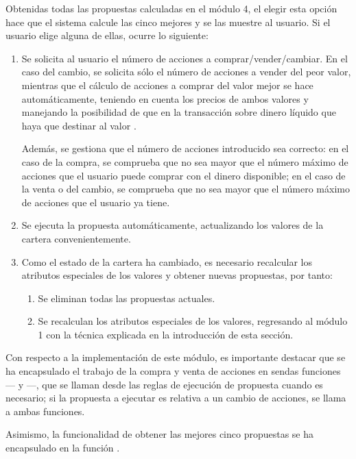 \documentclass[a4paper, 11pt, titlepage]{article}
\begin{document}
    Obtenidas todas las propuestas calculadas en el módulo 4, el elegir esta opción hace que el sistema calcule las cinco mejores y se las muestre al usuario. Si el usuario elige alguna de ellas, ocurre lo siguiente:
    \begin{enumerate}
        \item Se solicita al usuario el número de acciones a comprar/vender/cambiar. En el caso del cambio, se solicita sólo el número de acciones a vender del peor valor, mientras que el cálculo de acciones a comprar del valor mejor se hace automáticamente, teniendo en cuenta los precios de ambos valores y manejando la posibilidad de que en la transacción sobre dinero líquido que haya que destinar al valor .

        Además, se gestiona que el número de acciones introducido sea correcto: en el caso de la compra, se comprueba que no sea mayor que el número máximo de acciones que el usuario puede comprar con el dinero disponible; en el caso de la venta o del cambio, se comprueba que no sea mayor que el número máximo de acciones que el usuario ya tiene.
        \item Se ejecuta la propuesta automáticamente, actualizando los valores de la cartera convenientemente.

        \item Como el estado de la cartera ha cambiado, es necesario recalcular los atributos especiales de los valores y obtener nuevas propuestas, por tanto:
        \begin{enumerate}[3.1.]
            \item Se eliminan todas las propuestas actuales.
            \item Se recalculan los atributos especiales de los valores, regresando al módulo 1 con la técnica explicada en la introducción de esta sección.
        \end{enumerate}
    \end{enumerate}

    Con respecto a la implementación de este módulo, es importante destacar que se ha encapsulado el trabajo de la compra y venta de acciones en sendas funciones --- y ---, que se llaman desde las reglas de ejecución de propuesta cuando es necesario; si la propuesta a ejecutar es relativa a un cambio de acciones, se llama a ambas funciones.

    Asimismo, la funcionalidad de obtener las mejores cinco propuestas se ha encapsulado en la función .
\end{document}
